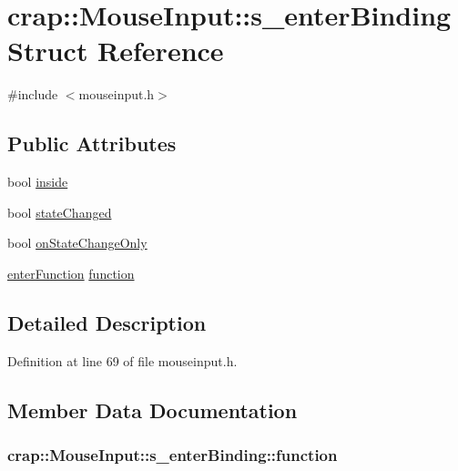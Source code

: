 \hypertarget{structcrap_1_1_mouse_input_1_1s__enter_binding}{}\section{crap\+:\+:Mouse\+Input\+:\+:s\+\_\+enter\+Binding Struct Reference}
\label{structcrap_1_1_mouse_input_1_1s__enter_binding}


{\ttfamily \#include $<$mouseinput.\+h$>$}

\subsection*{Public Attributes}
\begin{DoxyCompactItemize}
\item 
bool \hyperlink{structcrap_1_1_mouse_input_1_1s__enter_binding_a6f6172646c989b4a7a69ae49ce4e2261}{inside}
\item 
bool \hyperlink{structcrap_1_1_mouse_input_1_1s__enter_binding_a9a9cf1d85c415d3df678446429666c22}{state\+Changed}
\item 
bool \hyperlink{structcrap_1_1_mouse_input_1_1s__enter_binding_a117ebc1fa82e0c995ff658ec489bec8a}{on\+State\+Change\+Only}
\item 
\hyperlink{classcrap_1_1_mouse_input_a1fb324bddbf07f2a44cb0f98c7bc11e4}{enter\+Function} \hyperlink{structcrap_1_1_mouse_input_1_1s__enter_binding_ae6b6520d9e7d16717d51a4180eac5225}{function}
\end{DoxyCompactItemize}


\subsection{Detailed Description}


Definition at line 69 of file mouseinput.\+h.



\subsection{Member Data Documentation}
\hypertarget{structcrap_1_1_mouse_input_1_1s__enter_binding_ae6b6520d9e7d16717d51a4180eac5225}{}
\subsubsection[{function}]{ crap\+::\+Mouse\+Input\+::s\+\_\+enter\+Binding\+::function}\label{structcrap_1_1_mouse_input_1_1s__enter_binding_ae6b6520d9e7d16717d51a4180eac5225}


